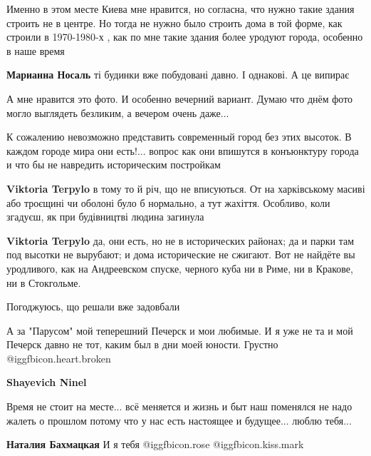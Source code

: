 \begin{itemize}
\begin{itemize}

Именно в этом месте Киева мне нравится, но согласна, что нужно такие здания
строить не в центре. Но тогда не нужно было строить дома в той форме, как
строили в 1970-1980-х , как по мне такие здания более уродуют города, особенно
в наше время

\begin{itemize} %
\textbf{Марианна Носаль} ті будинки вже побудовані давно. І однакові. А це випирає
\end{itemize} %


А мне нравится это фото. И особенно вечерний вариант. Думаю что днём фото могло
выглядеть безликим, а вечером очень даже...

К сожалению невозможно представить современный город без этих высоток. В каждом
городе мира они есть!... вопрос как они впишутся в конъюнктуру города и что бы
не навредить историческим постройкам

\begin{itemize} %
\textbf{Viktoria Terpylo} в тому то й річ, що не вписуються. От на харківському масиві або троєщині чи оболоні було б нормально, а тут жахіття. Особливо, коли згадуєш, як при будівництві людина загинула

\textbf{Viktoria Terpylo} да, они есть, но не в исторических районах; да и парки там под высотки не вырубают; и дома исторические не сжигают. Вот не найдёте вы уродливого, как на Андреевском спуске, черного куба ни в Риме, ни в Кракове, ни в Стокгольме.
\end{itemize} %

\end{itemize} %

Погоджуюсь, що решали вже задовбали

А за "Парусом" мой теперешний Печерск и мои любимые. И я уже не та и мой Печерск давно не тот, каким был в дни моей юности. Грустно @igg{fbicon.heart.broken} 

\begin{itemize} %
\textbf{Shayevich Ninel} 

Время не стоит на месте... всё меняется и жизнь и быт наш поменялся не надо
жалеть о прошлом потому что у нас есть настоящее и будущее... люблю тебя...

\textbf{Наталия Бахмацкая} И я тебя @igg{fbicon.rose}  @igg{fbicon.kiss.mark} 
\end{itemize} %


\end{itemize}
